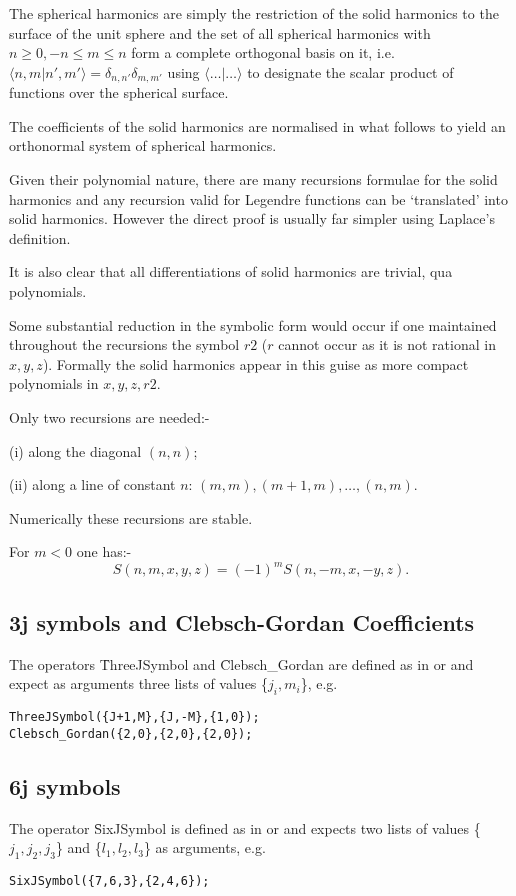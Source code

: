 The spherical harmonics are simply the restriction of the solid
harmonics to the surface of the unit sphere and the set of all
spherical harmonics with $n \geq 0, -n \leq m \leq n$ form a complete
orthogonal basis on it, i.e.\ $\langle n,m | n',m' \rangle
= \delta_{n,n'} \delta_{m,m'}$ using $\langle \ldots | \ldots \rangle$
to designate the scalar product of functions over the spherical
surface.

The coefficients of the solid harmonics are normalised in what
follows to yield an orthonormal system of spherical harmonics.

Given their polynomial nature, there are many recursions formulae
for the solid harmonics and any recursion valid for Legendre functions
can be `translated' into solid harmonics. However the direct proof is
usually far simpler using Laplace's definition.

It is also clear that all differentiations of solid harmonics are
trivial, qua polynomials.

Some substantial reduction in the symbolic form would occur if one
maintained throughout the recursions the symbol $r2$ ($r$ cannot occur
as it is not rational in $x,y,z$). Formally the solid harmonics appear
in this guise as more compact polynomials in $x,y,z,r2$.

Only two recursions are needed:-

(i) along the diagonal $(n,n)$;

(ii) along a line of constant $n$: $(m,m),(m+1,m),\ldots,(n,m)$.

Numerically these recursions are stable.

For $m < 0$ one has:-
\[ S(n,m,x,y,z) = (-1)^m S(n,-m,x,-y,z). \]

\subsection{3j symbols and Clebsch-Gordan Coefficients}
\hypertarget{CLEBSCHG}{}
The operators \f{ThreeJSymbol} and \f{Clebsch\_Gordan} are defined as 
in \cite{LandoltBoernstein:68} or \cite{Edmonds:57} and expect as arguments
three lists of values \{$j_i,m_i$\}, e.g.
\begin{verbatim}
ThreeJSymbol({J+1,M},{J,-M},{1,0});
Clebsch_Gordan({2,0},{2,0},{2,0});
\end{verbatim}

\subsection{6j symbols }
The operator \f{SixJSymbol} is defined as
in \cite{LandoltBoernstein:68} or \cite{Edmonds:57} and
expects two lists of values \{$j_1,j_2,j_3$\} and
\{$l_1,l_2,l_3$\} as arguments, e.g.
\begin{verbatim}
SixJSymbol({7,6,3},{2,4,6});
\end{verbatim}

